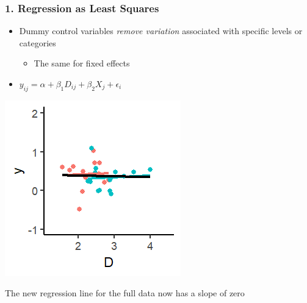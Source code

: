\documentclass[xcolor=x11names,compress]{beamer}\usepackage[]{graphicx}\usepackage[]{color}
\makeatletter
\def\maxwidth{ %
  \ifdim\Gin@nat@width>\linewidth
    \linewidth
  \else
    \Gin@nat@width
  \fi
}
\newenvironment{knitrout}{}{} %
\renewcommand{\(}{\begin{columns}}
\renewcommand{\)}{\end{columns}}
\newcommand{\<}[1]{\begin{column}{#1}}
\renewcommand{\>}{\end{column}}
\makeatother
\begin{document}
\begin{frame}
\frametitle{1. Regression as Least Squares}
\begin{itemize}
\item Dummy control variables \textit{remove variation} associated with specific levels or categories
\begin{itemize}
\item The same for fixed effects
\end{itemize}
\item $y_{ij} = \alpha + \beta_1 D_{ij} + \beta_2 X_j + \epsilon_i$
\end{itemize}
\begin{multicols}{2}
\begin{knitrout}
\color{fgcolor}
\includegraphics[width=\maxwidth]{figure/graph_ols_FE5-1} 

\end{knitrout}
\columnbreak
The new regression line for the full data now has a slope of zero
\end{multicols}
\end{frame}
\end{document}
